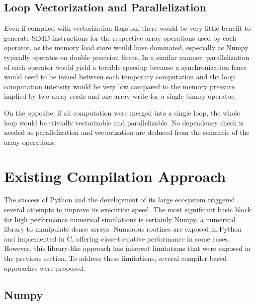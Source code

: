 \documentclass[10pt, preprint]{sigplanconf}
\begin{document}
\subsection{Loop Vectorization and Parallelization}

Even if compiled with vectorization flags on, there would be very little
benefit to generate SIMD instructions for the respective array operations used
by each operator, as the memory load store would have dominated, especially as
Numpy typically operates on double precision floats. In a similar manner,
parallelization of each operator would yield a terrible speedup because a
synchronization fence would need to be issued between each temporary
computation and the loop computation intensity would be very low compared to
the memory pressure implied by two array reads and one array write for a single
binary operator.

On the opposite, if all computation were merged into a single loop, the whole
loop would be trivially vectorizable and parallelizable. 
No dependency check is needed as parallelization and vectorization are deduced 
from the semantic of the array operations.

\section{Existing Compilation Approach}
\label{sec:compilers}

The success of Python and the development of its large ecosystem triggered
several attempts to improve its execution speed. The most significant basic 
block for high performance numerical simulations is certainly Numpy, a 
numerical library to manipulate dense arrays. Numerous routines are exposed in 
Python and implemented in C, offering close-to-native performance in some cases.
% 
However, this library-like approach has inherent limitations that were exposed 
in the previous section. To address these limitations, several compiler-based 
approaches were proposed.

\subsection{Numpy}
\cite{oliphant2007,numpyarray2011}
\end{document}
